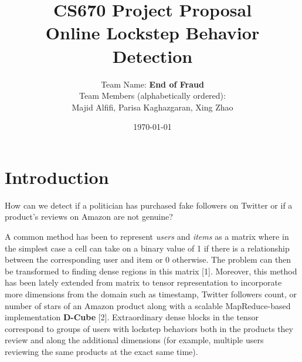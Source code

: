 \documentclass[12pt]{article}
\begin{document}
 
 
\title{CS670 Project Proposal\\Online Lockstep Behavior Detection}
\author{
Team Name: \textbf{End of Fraud}\\[2ex]
\small{Team Members (alphabetically ordered):}\\
Majid Alfifi, Parisa Kaghazgaran,  Xing Zhao
}

\date{\today}
 
 
 
\maketitle
 
 
\section{Introduction}
 

How can we detect if a politician has purchased fake followers on Twitter or if a product's reviews on Amazon are not genuine?

A common method has been to represent \emph{users} and \emph{items} as a matrix where in the simplest case a cell can take on a binary value of 1 if there is a relationship between the corresponding user and item or 0 otherwise. The problem can then be transformed to finding dense regions in this matrix [1]. Moreover, this method has been lately extended from matrix to tensor representation to incorporate more dimensions from the domain such as timestamp, Twitter followers count, or number of stars of an Amazon product along with a scalable MapReduce-based implementation \textbf{D-Cube} [2]. Extraordinary dense blocks in the tensor correspond to groups of users with lockstep behaviors both in the products they review and along the additional dimensions (for example, multiple users reviewing the same products at the exact same time). 
\end{document}
